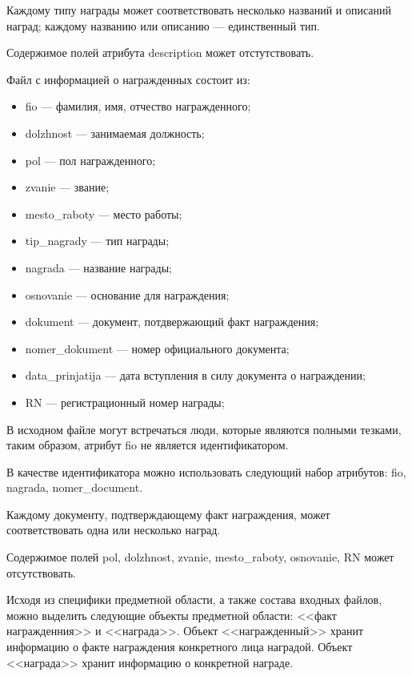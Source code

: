 Каждому типу награды может соответствовать несколько названий и описаний наград;
каждому названию или описанию --- единственный тип.

Содержимое полей атрибута description может отстутствовать.

Файл с информацией о награжденных состоит из:
\begin{itemize}
\item
  fio --- фамилия, имя, отчество награжденного;
\item
  dolzhnost --- занимаемая должность;
\item
  pol --- пол награжденного;
\item
  zvanie --- звание;
\item
  mesto\_raboty --- место работы;
\item 
  tip\_nagrady --- тип награды;
\item
  nagrada --- название награды;
\item
  osnovanie --- основание для награждения;
\item
  dokument --- документ, потдвержающий факт награждения;
\item
  nomer\_dokument --- номер официального документа;
\item
  data\_prinjatija --- дата вступления в силу документа о награждении;
\item
  RN --- регистрационный номер награды;
\end{itemize}

В исходном файле могут встречаться люди, которые являются полными тезками,
таким образом, атрибут fio не является идентификатором.

В качестве идентификатора можно использовать следующий набор атрибутов:
fio, nagrada, nomer\_document.

Каждому документу, подтверждающему факт награждения, может соответствовать одна
или несколько наград.

Содержимое полей pol, dolzhnost, zvanie, mesto\_raboty, osnovanie, RN может отсутствовать.

Исходя из специфики предметной области, а также состава входных файлов, можно выделить
следующие объекты предметной области: <<факт награжденния>> и <<награда>>.
Объект <<награжденный>> хранит информацию о факте награждения конкретного лица наградой.
Объект <<награда>> хранит информацию о конкретной награде.


